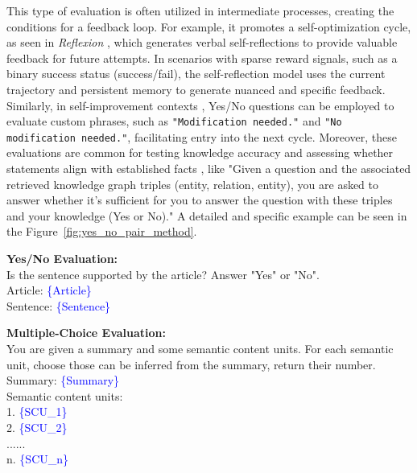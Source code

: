 \documentclass[acmsmall,screen]{acmart}
\begin{document}
This type of evaluation is often utilized in intermediate processes, creating the conditions for a feedback loop. For example, it promotes a self-optimization cycle, as seen in \textit{Reflexion} \citep{nips_reflexion}, which generates verbal self-reflections to provide valuable feedback for future attempts. In scenarios with sparse reward signals, such as a binary success status (success/fail), the self-reflection model uses the current trajectory and persistent memory to generate nuanced and specific feedback.
Similarly, in self-improvement contexts \citep{ucla_creativity_macgyver}, Yes/No questions can be employed to evaluate custom phrases, such as \texttt{"Modification needed."} and \texttt{"No modification needed."}, facilitating entry into the next cycle.
Moreover, these evaluations are common for testing knowledge accuracy and assessing whether statements align with established facts \citep{think_on_graph}, like "Given a question and the associated retrieved knowledge graph triples (entity, relation, entity), you are asked to answer whether it's sufficient for you to answer the question with these triples and your knowledge (Yes or No)." A detailed and specific example can be seen in the Figure~\ref{fig:yes_no_pair_method}.

    

    

\begin{tcolorbox}[colback=gray!10, colframe=gray!90!black, title={Evaluation Prompt Templates for Yes/No and Multiple-Choice Tasks}]
\textbf{Yes/No Evaluation:}\\
Is the sentence supported by the article? Answer "Yes" or "No".\\
Article: \textcolor{blue}{\{Article\}} \\
Sentence: \textcolor{blue}{\{Sentence\}}

\vspace{6pt}
\textbf{Multiple-Choice Evaluation:}\\
You are given a summary and some semantic content units. For each semantic unit, choose those can be inferred from the summary, return their number.\\
Summary: \textcolor{blue}{\{Summary\}} \\
Semantic content units: \\
1. \textcolor{blue}{\{SCU\_1\}} \\
2. \textcolor{blue}{\{SCU\_2\}} \\
...... \\
n. \textcolor{blue}{\{SCU\_n\}}
\end{tcolorbox}
\end{document}
